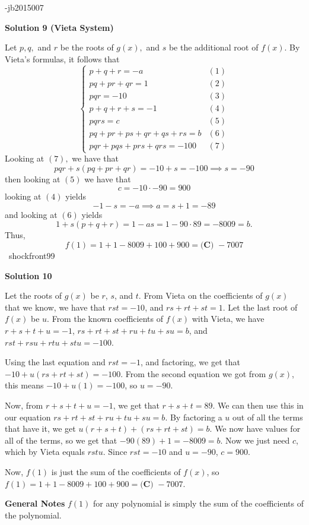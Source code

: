 \begin{enumerate}
 -jb2015007

 



\textbf{Solution 9 (Vieta System)}

Let $p,q,$ and $r$ be the roots of $g(x),$ and $s$ be the additional root of $f(x).$ By Vieta's formulas, it follows that
 \[\begin{cases}p+q+r=-a &(1)\\pq+pr+qr=1 &(2)\\pqr=-10 &(3)\\ p+q+r+s=-1 &(4)\\ pqrs=c &(5)\\pq+pr+ps+qr+qs+rs=b &(6)\\ pqr+pqs+prs+qrs=-100 &(7)\end{cases}\]Looking at $(7),$ we have that
 \[pqr+s(pq+pr+qr)=-10+s=-100\implies s=-90\]then looking at $(5)$ we have that 
 \[c=-10\cdot-90=900\]looking at $(4)$ yields
 \[-1-s=-a\implies a=s+1=-89\]and looking at $(6)$ yields
 \[1+s(p+q+r)=1-as=1-90\cdot89=-8009=b.\]Thus,
 \[f(1)=1+1-8009+100+900=\boxed{\textbf{(C) }-7007}\]~shockfront99

 



\textbf{Solution 10}

Let the roots of $g(x)$ be $r$, $s$, and $t$. From Vieta on the coefficients of $g(x)$ that we know, we have that $rst = -10$, and $rs + rt + st = 1$. Let the last root of $f(x)$ be $u$. From the known coefficients of $f(x)$ with Vieta, we have $r + s + t + u = -1$, $rs + rt + st + ru + tu + su = b$, and $rst + rsu + rtu + stu = -100$.

 Using the last equation and $rst = -1$, and factoring, we get that $-10 + u(rs + rt + st) = -100$. From the second equation we got from $g(x)$, this means $-10 + u(1) = -100$, so $u = -90$.

 Now, from $r + s + t + u = -1$, we get that $r + s + t = 89$. We can then use this in our equation $rs + rt + st + ru + tu + su = b$. By factoring a $u$ out of all the terms that have it, we get $u(r + s + t) + (rs + rt + st) = b$. We now have values for all of the terms, so we get that $-90(89) + 1 = -8009 = b$. Now we just need $c$, which by Vieta equals $rstu$. Since $rst = -10$ and $u = -90$, $c = 900$.

 Now, $f(1)$ is just the sum of the coefficients of $f(x)$, so $f(1) = 1 + 1 - 8009 + 100 + 900 = \boxed{\textbf{(C) }-7007}$.

 \textbf{General Notes} $f(1)$ for any polynomial is simply the sum of the coefficients of the polynomial.


\end{enumerate}
